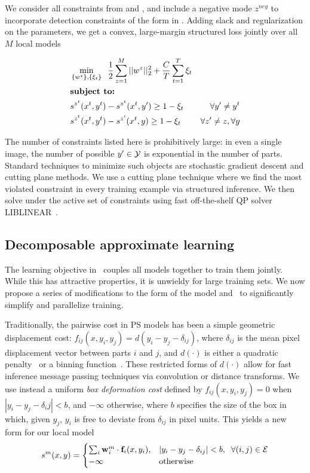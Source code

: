 We consider all constraints from  and , and include a 
negative mode $z^{neg}$ to incorporate detection constraints of the form in 
.  Adding slack and regularization on the parameters, we get a 
convex, large-margin structured loss jointly over all $M$ local models

\begin{align}\label{eq:full-learn}
&\min_{\{w^z\}, \{\xi_{t}\}} \;\; \frac{1}{2} \sum_{z=1}^M ||w^z||_2^2 + 
\frac{C}{T} \sum_{t=1}^T \xi_t \\
&\text{\bf{subject to:} } \\
&s^{z^t}(x^t,y^t) - s^{z^t}(x^t,y') \geq 1 - \xi_t\;\; &\forall y' \neq y^t \\
&s^{z^t}(x^t,y^t) - s^{z'}(x^t,y)  \geq 1 - \xi_t\;\; &\forall z' \neq z, 
\forall y \end{align}

The number of constraints listed here is prohibitively large: in even a single 
image, the number of possible $y' \in \mathcal{Y}$ is exponential in the number of 
parts.  Standard techniques to minimize such objects are stochastic gradient 
descent and cutting plane methods.  We use a cutting plane technique where we 
find the most violated constraint in every training example via structured 
inference.  We then solve  under the active set of 
constraints using fast off-the-shelf QP solver LIBLINEAR~\citep{liblinear}.

\subsection{Decomposable approximate learning}
The learning objective in~ couples all models together to 
train them jointly.  While this has attractive properties, it is unwieldy for 
large training sets.  We now propose a series of modifications to the form of 
the model and~ to significantly simplify and parallelize 
training.

\label{sec:boxdist}
Traditionally, the pairwise cost in PS models has been a simple geometric 
displacement cost: $f_{ij}(x,y_i,y_j) = d(y_i - y_j - \delta_{ij})$, where 
$\delta_{ij}$ is the mean pixel displacement vector between parts $i$ and $j$, 
and $d(\cdot)$ is either a quadratic penalty~\citep{felz05} or a binning 
function~\citep{devacrf}.  These restricted forms of $d(\cdot)$ allow for fast 
inference message passing techniques via convolution or distance transforms.  
We use instead a uniform {\em box deformation cost} defined by 
$f_{ij}(x,y_i,y_j) = 0$ when $|y_i - y_j - \delta_ij| < b$, and $-\infty$ 
otherwise, where $b$ specifies the size of the box in which, given $y_j$, $y_i$ 
is free to deviate from $\delta_{ij}$ in pixel units.  This yields a new form 
for our local model \begin{align}\label{eq:boxdist}
s^m(x,y) = 
\begin{cases}
 \sum_i \mathbf{w}^m_i \cdot \mathbf{f}_i(x,y_i), & |y_i - y_j - \delta_{ij}| < b,\;\; \forall 
(i,j) \in \mathcal{E} \\
 -\infty & \text{otherwise}
 \end{cases}
\end{align}


